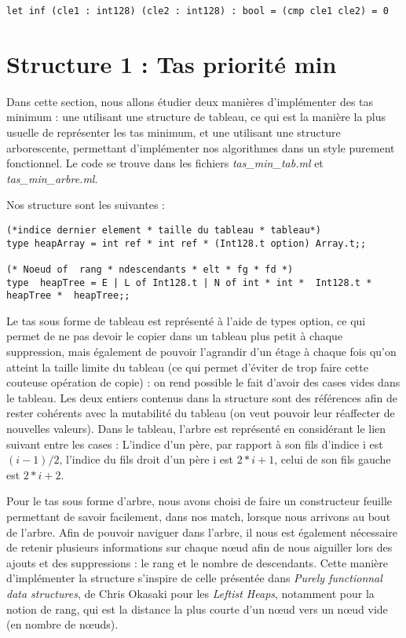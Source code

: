 \documentclass[12pt,a4paper]{article}
\begin{document}
\begin{lstlisting}
let inf (cle1 : int128) (cle2 : int128) : bool = (cmp cle1 cle2) = 0
\end{lstlisting}



\section{Structure 1 : Tas priorité min}

Dans cette section, nous allons étudier deux manières d'implémenter des tas minimum : une utilisant une structure de tableau, ce qui est la manière la plus usuelle de représenter les tas minimum, et une utilisant une structure arborescente, permettant d'implémenter nos algorithmes dans un style purement fonctionnel.
Le code se trouve dans les fichiers \textit{tas\_min\_tab.ml} et \textit{tas\_min\_arbre.ml}. 

Nos structure sont les suivantes : 

\begin{lstlisting}
(*indice dernier element * taille du tableau * tableau*)
type heapArray = int ref * int ref * (Int128.t option) Array.t;;

(* Noeud of  rang * ndescendants * elt * fg * fd *)
type  heapTree = E | L of Int128.t | N of int * int *  Int128.t *  heapTree *  heapTree;;
\end{lstlisting}

Le tas sous forme de tableau est représenté à l'aide de types option, ce qui permet de ne pas devoir le copier dans un tableau plus petit à chaque suppression, mais également de pouvoir l'agrandir d'un étage à chaque fois qu'on atteint la taille limite du tableau (ce qui permet d'éviter de trop faire cette couteuse opération de copie) : on rend possible le fait d'avoir des cases vides dans le tableau. Les deux entiers contenus dans la structure sont des références afin de rester cohérents avec la mutabilité du tableau (on veut pouvoir leur réaffecter de nouvelles valeurs). Dans le tableau, l'arbre est représenté en considérant le lien suivant entre les cases : L'indice d'un père, par rapport à son fils d'indice i est $(i-1)/2$, l'indice du fils droit d'un père i est $2*i +1$, celui de son fils gauche est $2*i+2$.


Pour le tas sous forme d'arbre, nous avons choisi de faire un constructeur feuille permettant de savoir facilement, dans nos match, lorsque nous arrivons au bout de l'arbre. Afin de pouvoir naviguer dans l'arbre, il nous est également nécessaire de retenir plusieurs informations sur chaque nœud afin de nous aiguiller lors des ajouts et des suppressions : le rang et le nombre de descendants. Cette manière d'implémenter la structure s'inspire de celle présentée dans \textit{Purely functionnal data structures}, de Chris Okasaki \cite{DataStructure} pour les \textit{Leftist Heaps}, notamment pour la notion de rang, qui est la distance la plus courte d'un nœud vers un nœud vide (en nombre de nœuds). 
\end{document}
